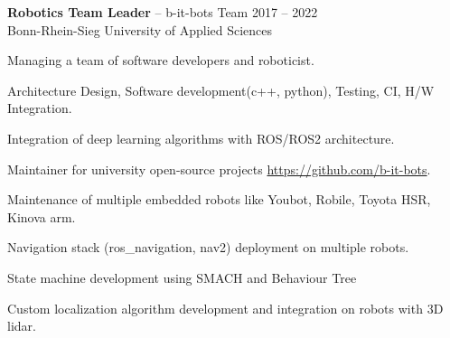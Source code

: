 \documentclass{article}
\newcommand{\employer}[4]{{
\vspace*{2pt}%
\textbf{#1} #2 \hfill #3\\ #4 \vspace*{2pt}}
}
\renewcommand{\labelitemii}{
	\raisebox{0.3ex}{\tiny\textbullet}
}
\newenvironment{bullet-list-minor}{
\begin{list}{\labelitemii}{\setlength\leftmargin{15pt} 
\topsep 0pt \itemsep -2pt}}{\vspace*{4pt}\end{list}
}
\begin{document}
    \employer{Robotics Team Leader}{-- b-it-bots Team}{2017 -- 2022}
    {Bonn-Rhein-Sieg University of Applied Sciences}
	\begin{bullet-list-minor}
		\item Managing a team of software developers and roboticist.
		\item Architecture Design, Software development(c++, python), Testing, CI, H/W Integration.
		\item Integration of deep learning algorithms with ROS/ROS2 architecture.
		\item Maintainer for university open-source projects \url{https://github.com/b-it-bots}.
		\item Maintenance of multiple embedded robots like Youbot, Robile, Toyota HSR, Kinova arm.
		\item Navigation stack (ros\_navigation, nav2) deployment on multiple robots.
		\item State machine development using SMACH and Behaviour Tree
		\item Custom localization algorithm development and integration on robots with 3D lidar.
    \end{bullet-list-minor}
    
    
\end{document}
